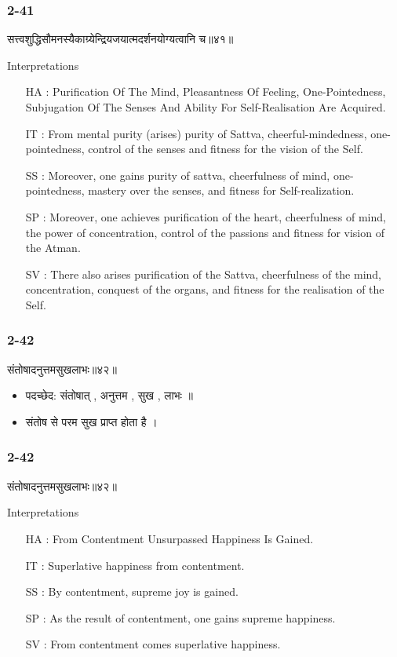 \begin{frame}[fragile]\frametitle{2-41}
\begin{sanskrit}
सत्त्वशुद्धिसौमनस्यैकाग्र्येन्द्रियजयात्मदर्शनयोग्यत्वानि च॥४१॥
\end{sanskrit}

Interpretations
\begin{itemize}
\item [HA]: Purification Of The Mind, Pleasantness Of Feeling, One-Pointedness, Subjugation Of The Senses And Ability For Self-Realisation Are Acquired.
\item [IT]: From mental purity (arises) purity of Sattva, cheerful-mindedness, one-pointedness, control of the senses and fitness for the vision of the Self.
\item [SS]: Moreover, one gains purity of sattva, cheerfulness of mind, one-pointedness, mastery over the senses, and fitness for Self-realization.
\item [SP]: Moreover, one achieves purification of the heart, cheerfulness of mind, the power of concentration, control of the passions and fitness for vision of the Atman.
\item [SV]: There also arises purification of the Sattva, cheerfulness of the mind, concentration, conquest of the organs, and fitness for the realisation of the Self. 
\end{itemize}
		
\end{frame}

\begin{frame}[fragile]\frametitle{2-42}
\begin{sanskrit}
संतोषादनुत्तमसुखलाभः॥४२॥
\end{sanskrit}

\begin{itemize}
\item पदच्छेद: संतोषात् , अनुत्तम , सुख , लाभः ॥
\item संतोष से परम सुख प्राप्त होता है ।
\end{itemize}	
	
\end{frame}

\begin{frame}[fragile]\frametitle{2-42}
\begin{sanskrit}
संतोषादनुत्तमसुखलाभः॥४२॥
\end{sanskrit}

Interpretations
\begin{itemize}
\item [HA]: From Contentment Unsurpassed Happiness Is Gained.
\item [IT]: Superlative happiness from contentment.
\item [SS]: By contentment, supreme joy is gained.
\item [SP]: As the result of contentment, one gains supreme happiness.
\item [SV]: From contentment comes superlative happiness. 
\end{itemize}
\end{frame}


